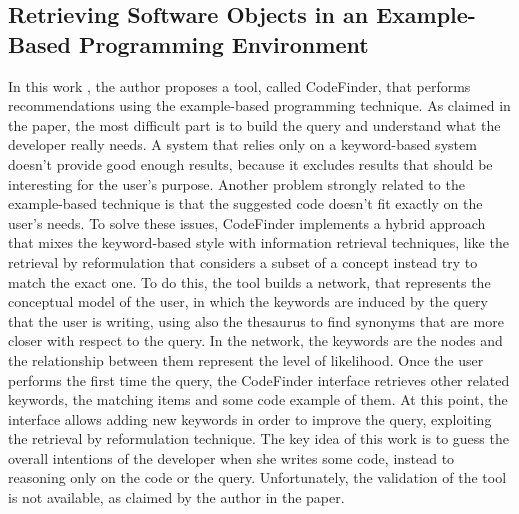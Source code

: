 \subsection{Retrieving Software Objects in an Example-Based Programming Environment}
In this work \cite{DBLP:conf/sigir/Henningen91}, the author proposes a tool, called CodeFinder, that performs recommendations using the example-based programming technique. As claimed in the paper, the most difficult part is to build the query and understand what the developer really needs. A system that relies only on a keyword-based system doesn't provide good enough results, because it excludes results that should be interesting for the user's purpose. Another problem strongly related to the example-based technique is that the suggested code doesn't fit exactly on the user's needs. To solve these issues, CodeFinder implements a hybrid approach that mixes the keyword-based style with information retrieval techniques, like the retrieval by reformulation that considers a subset of a concept instead try to match the exact one. To do this, the tool builds a network, that represents the conceptual model of the user, in which the keywords are induced by the query that the user is writing, using also the thesaurus to find synonyms that are more closer with respect to the query.  In the network, the keywords are the nodes and the relationship between them represent the level of likelihood. Once the user performs the first time the query, the CodeFinder interface retrieves other related keywords, the matching items and some code example of them. At this point, the interface allows adding new keywords in order to improve the query, exploiting the retrieval by reformulation technique. The key idea of this work is to guess the overall intentions of the developer when she writes some code, instead to reasoning only on the code or the query. Unfortunately, the validation of the tool is not available, as claimed by the author in the paper.

